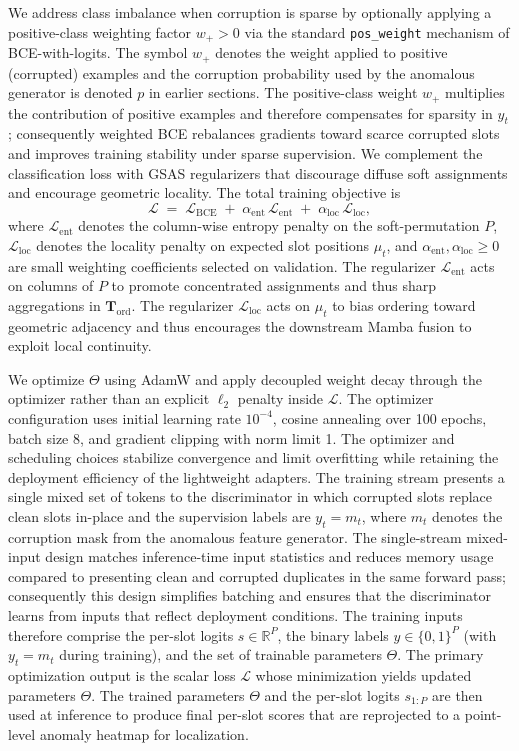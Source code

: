 We address class imbalance when corruption is sparse by optionally applying a positive-class weighting factor \(w_+>0\) via the standard \texttt{pos\_weight} mechanism of BCE-with-logits. The symbol \(w_+\) denotes the weight applied to positive (corrupted) examples and the corruption probability used by the anomalous generator is denoted \(p\) in earlier sections. The positive-class weight \(w_+\) multiplies the contribution of positive examples and therefore compensates for sparsity in \(y_t\); consequently weighted BCE rebalances gradients toward scarce corrupted slots and improves training stability under sparse supervision. We complement the classification loss with GSAS regularizers that discourage diffuse soft assignments and encourage geometric locality. The total training objective is
\begin{equation}
\mathcal{L} \;=\; \mathcal{L}_{\mathrm{BCE}} \;+\; \alpha_{\mathrm{ent}}\,\mathcal{L}_{\mathrm{ent}} \;+\; \alpha_{\mathrm{loc}}\,\mathcal{L}_{\mathrm{loc}},
\end{equation}
where \(\mathcal{L}_{\mathrm{ent}}\) denotes the column-wise entropy penalty on the soft-permutation \(P\), \(\mathcal{L}_{\mathrm{loc}}\) denotes the locality penalty on expected slot positions \(\mu_t\), and \(\alpha_{\mathrm{ent}},\alpha_{\mathrm{loc}}\ge 0\) are small weighting coefficients selected on validation. The regularizer \(\mathcal{L}_{\mathrm{ent}}\) acts on columns of \(P\) to promote concentrated assignments and thus sharp aggregations in \(\mathbf{T}_{\mathrm{ord}}\). The regularizer \(\mathcal{L}_{\mathrm{loc}}\) acts on \(\mu_t\) to bias ordering toward geometric adjacency and thus encourages the downstream Mamba fusion to exploit local continuity.

We optimize \(\Theta\) using AdamW and apply decoupled weight decay through the optimizer rather than an explicit \(\ell_2\) penalty inside \(\mathcal{L}\). The optimizer configuration uses initial learning rate \(10^{-4}\), cosine annealing over 100 epochs, batch size 8, and gradient clipping with norm limit 1. The optimizer and scheduling choices stabilize convergence and limit overfitting while retaining the deployment efficiency of the lightweight adapters. The training stream presents a single mixed set of tokens to the discriminator in which corrupted slots replace clean slots in-place and the supervision labels are \(y_t=m_t\), where \(m_t\) denotes the corruption mask from the anomalous feature generator. The single-stream mixed-input design matches inference-time input statistics and reduces memory usage compared to presenting clean and corrupted duplicates in the same forward pass; consequently this design simplifies batching and ensures that the discriminator learns from inputs that reflect deployment conditions. The training inputs therefore comprise the per-slot logits \(s\in\mathbb{R}^P\), the binary labels \(y\in\{0,1\}^P\) (with \(y_t=m_t\) during training), and the set of trainable parameters \(\Theta\). The primary optimization output is the scalar loss \(\mathcal{L}\) whose minimization yields updated parameters \(\Theta\). The trained parameters \(\Theta\) and the per-slot logits \(s_{1:P}\) are then used at inference to produce final per-slot scores that are reprojected to a point-level anomaly heatmap for localization.

